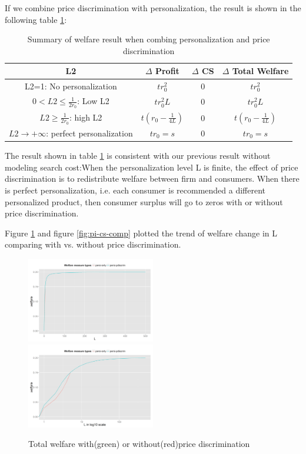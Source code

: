 \documentclass[11pt, oneside]{article}   	%
\begin{document}
If we combine price discrimination with personalization, the result is shown in the following table \ref{tab:combine}:
\begin{table}[ht]
\begin{tabular}[h]{|c|c|c|c|}
\hline 
L2 &  $\Delta$ Profit  & $\Delta$ CS & $\Delta$ Total Welfare \\
\hline \hline
L2=1: No personalization & $tr_0^2$ & 0&$tr_0^2$\\
\hline
$0<L2\leq \frac{1}{2r_0} $: Low L2 & $ tr_0^2L$ & 0&$ tr_0^2L$\\
\hline
$L2 \geq \frac{1}{2r_0}$: high L2 & $t(r_0 -\frac{1}{4L})$ & 0&$t(r_0 - \frac{1}{4L})$ \\
\hline
$L2\to +\infty$: perfect personalization&$tr_0=s$&0&$tr_0=s$\\
\hline
\end{tabular}
\caption{Summary of welfare result when combing personalization and price discrimination}
\label{tab:combine}
\end{table}
The result shown in table \ref{tab:combine} is consistent with our previous result without modeling search cost:When the personalization level L is finite, the effect of price discrimination is to redistribute welfare between firm and consumers. When there is perfect personalization, i.e. each consumer is recommended a different personalized product, then consumer surplus will go to zeros with or without price discrimination.

Figure \ref{fig:tw-comp} and figure \ref{fig:pi-cs-comp} plotted the trend of welfare change in L comparing with vs. without price discrimination.

\begin{figure}
\includegraphics[width= 0.5\textwidth ,height =0.3\textheight]{compareTW-persi-pdiscrimvspersi-only.png}
\includegraphics[width= 0.5\textwidth ,height =0.3\textheight]{compareTW-persi-pdiscrimvspersi-only-logscale.png}
\caption{Total welfare with(green) or without(red)price discrimination}
\label{fig:tw-comp}
\end{figure}
\end{document}
